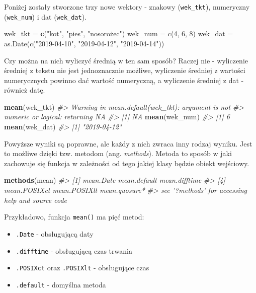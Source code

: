 \documentclass[paper=6in:9in,pagesize=pdftex,headinclude=on,footinclude=on,10pt]{scrbook}
\newenvironment{Shaded}{\begin{snugshade}}{\end{snugshade}}
\newcommand{\CommentTok}[1]{\textcolor[rgb]{0.56,0.35,0.01}{\textit{#1}}}
\newcommand{\DecValTok}[1]{\textcolor[rgb]{0.00,0.00,0.81}{#1}}
\newcommand{\KeywordTok}[1]{\textcolor[rgb]{0.13,0.29,0.53}{\textbf{#1}}}
\newcommand{\NormalTok}[1]{#1}
\newcommand{\StringTok}[1]{\textcolor[rgb]{0.31,0.60,0.02}{#1}}
\providecommand{\tightlist}{%
  \setlength{\itemsep}{0pt}\setlength{\parskip}{0pt}}
\begin{document}
Poniżej zostały stworzone trzy nowe wektory - znakowy (\texttt{wek\_tkt}), numeryczny (\texttt{wek\_num}) i dat (\texttt{wek\_dat}).

\begin{Shaded}
\begin{Highlighting}[]
\NormalTok{wek_tkt =}\StringTok{ }\KeywordTok{c}\NormalTok{(}\StringTok{"kot"}\NormalTok{, }\StringTok{"pies"}\NormalTok{, }\StringTok{"nosorożec")}
\StringTok{wek_num = c(4, 6, 8)}
\StringTok{wek_dat = as.Date(c("}\DecValTok{2019-04-10}\StringTok{", "}\DecValTok{2019-04-12}\StringTok{", "}\DecValTok{2019-04-14}\StringTok{"))}
\end{Highlighting}
\end{Shaded}

Czy można na nich wyliczyć średnią w ten sam sposób?
Raczej nie - wyliczenie średniej z tekstu nie jest jednoznacznie możliwe, wyliczenie średniej z wartości numerycznych powinno dać wartość numeryczną, a wyliczenie średniej z dat - również datę.

\begin{Shaded}
\begin{Highlighting}[]
\KeywordTok{mean}\NormalTok{(wek_tkt)}
\CommentTok{#> Warning in mean.default(wek_tkt): argument is not}
\CommentTok{#> numeric or logical: returning NA}
\CommentTok{#> [1] NA}
\KeywordTok{mean}\NormalTok{(wek_num)}
\CommentTok{#> [1] 6}
\KeywordTok{mean}\NormalTok{(wek_dat)}
\CommentTok{#> [1] "2019-04-12"}
\end{Highlighting}
\end{Shaded}

Powyższe wyniki są poprawne, ale każdy z nich zwraca inny rodzaj wyniku.
Jest to możliwe dzięki tzw. metodom (ang. \emph{methods}).
Metoda to sposób w jaki zachowuje się funkcja w zależności od tego jakiej klasy będzie obiekt wejściowy.

\begin{Shaded}
\begin{Highlighting}[]
\KeywordTok{methods}\NormalTok{(mean)}
\CommentTok{#> [1] mean.Date     mean.default  mean.difftime}
\CommentTok{#> [4] mean.POSIXct  mean.POSIXlt  mean.quosure*}
\CommentTok{#> see '?methods' for accessing help and source code}
\end{Highlighting}
\end{Shaded}

Przykładowo, funkcja \texttt{mean()} ma pięć metod:

\begin{itemize}
\tightlist
\item
  \texttt{.Date} - obsługującą daty
\item
  \texttt{.difftime} - obsługującą czas trwania
\item
  \texttt{.POSIXct} oraz \texttt{.POSIXlt} - obsługujące czas
\item
  \texttt{.default} - domyślna metoda
\end{itemize}
\end{document}
